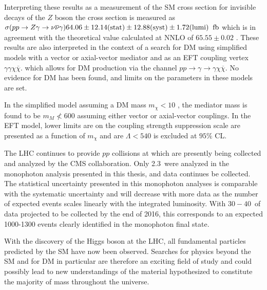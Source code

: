 Interpreting these results as a measurement of the SM
 cross section for invisible decays of the $Z$ boson
 the cross section is measured as
 $\sigma(pp\rightarrow Z\gamma\rightarrow\nu\overline{\nu}\gamma) 64.06 \pm 12.14(\mathrm{stat}) \pm 12.88(\mathrm{syst}) \pm 1.72(\mathrm{lumi})\;\; \mathrm{fb} $
 which is in agreement with the theoretical value calculated at NNLO
 of $65.55\pm 0.02$ \fbinv.
These results are also interpreted in the context of a search for DM
 using simplified models with a vector or axial-vector mediator and as an
 EFT coupling vertex
 $\gamma\gamma\chi\overline{\chi}$.
 which allows for DM production via 
 the channel
 $pp\rightarrow\gamma\rightarrow\gamma\chi\overline{\chi}$.
No evidence for DM has been found, and limits on the
 parameters in these models are set.

In the simplified model assuming a DM mass $m_\chi < 10$ \GeV, the mediator
 mass is found to be $m_M \nless 600$ \GeV assuming either
 vector or axial-vector couplings.
In the EFT model, lower limits are on the
 coupling strength suppression scale 
 are presented as a function of $m_\chi$ and are 
 $\Lambda < 540$ \GeV is excluded at $95\%$ CL.

The LHC continues to provide $pp$ collisions at  \TeV
 which are presently being collected and analyzed by the CMS collaboration.
Only 2.3~\fbinv were analyzed in the monophoton 
 analysis presented in this thesis, and 
 data continues be collected.
The statistical uncertainty presented in this monophoton analyses
 is comparable with the systematic uncertainty
 and will decrease with more data as the number of expected
 events scales linearly with the integrated luminosity.
With $30-40$~\fbinv of data projected to be
 collected by the end of 2016, this corresponds to 
 an expected 1000-1300 events clearly identified
 in the monophoton final state.

With the discovery of the Higgs boson
 at the LHC, all fundamental particles
 predicted by the SM
 have now been observed.
Searches for physics beyond the SM
 and for DM in particular are therefore 
 an exciting field of study
 and could possibly lead to new understandings of
 the material hypothesized to constitute the majority 
 of mass throughout the universe.
 




